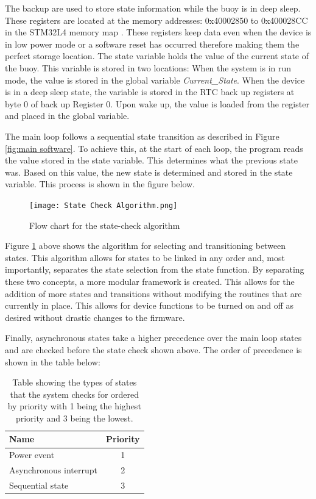 The backup are used to store state information while the buoy is in deep sleep. These registers are located at the memory addresses: 0x40002850 to 0x400028CC in the STM32L4 memory map \cite{stm32l4ref}. These registers keep data even when the device is in low power mode or a software reset has occurred therefore making them the perfect storage location. The state variable holds the value of the current state of the buoy. This variable is stored in two locations: When the system is in run mode, the value is stored in the global variable \textit{Current\_State}. When the device is in a deep sleep state, the variable is stored in the RTC back up registers at byte 0 of back up Register 0. Upon wake up, the value is loaded from the register and placed in the global variable.

The main loop follows a sequential state transition as described in Figure \ref{fig:main software}. To achieve this, at the start of each loop, the program reads the value stored in the state variable. This determines what the previous state was. Based on this value, the new state is determined and stored in the state variable. This process is shown in the figure below.

\begin{figure}[H]
	\centering
	\texttt{[image: State Check Algorithm.png]}
	\caption{Flow chart for the state-check algorithm}
	\label{fig:state_check}
\end{figure}

Figure \ref{fig:state_check} above shows the algorithm for selecting and transitioning between states. This algorithm allows for states to be linked in any order and, most importantly, separates the state selection from the state function. By separating these two concepts, a more modular framework is created. This allows for the addition of more states and transitions without modifying the routines that are currently in place. This allows for device functions to be turned on and off as desired without drastic changes to the firmware.

Finally, asynchronous states take a higher precedence over the main loop states and are checked before the state check shown above. The order of precedence is shown in the table below:
\begin{table}[H]
	\centering
	\caption{Table showing the types of states that the system checks for ordered by priority with 1 being the highest priority and 3 being the lowest.}
	\begin{tabular}{lc}
		\hline
		Name & Priority \\
		\hline
		\hline
		Power event & 1 \\

		Asynchronous interrupt & 2 \\
		\hline
		Sequential state & 3 \\
		\hline
		\hline
	\end{tabular}
	
	\label{tab:state_prio}
\end{table}

